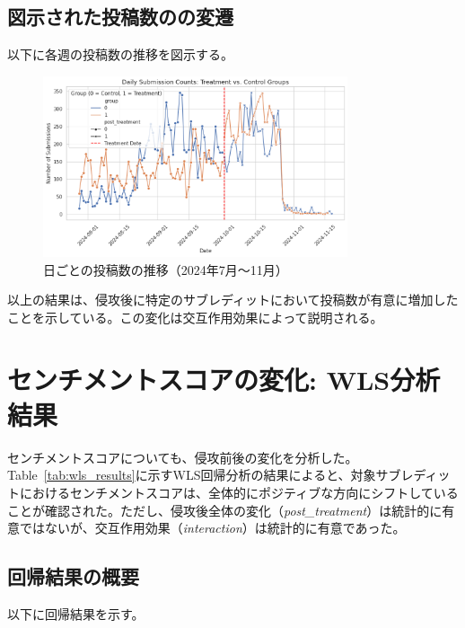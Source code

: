 \documentclass[11pt, a4j]{jreport}
\begin{document}
    \subsection*{図示された投稿数のの変遷}
    以下に各週の投稿数の推移を図示する。
    \begin{figure}[H]
        \centering
        \includegraphics[width=0.8\textwidth]{submission_count_plot.png}
        \caption{日ごとの投稿数の推移（2024年7月～11月）}
        \label{fig:submissions_comments_trends}
    \end{figure}

    以上の結果は、侵攻後に特定のサブレディットにおいて投稿数が有意に増加したことを示している。この変化は交互作用効果によって説明される。

    \section{センチメントスコアの変化: WLS分析結果}
    センチメントスコアについても、侵攻前後の変化を分析した。Table~\ref{tab:wls_results}に示すWLS回帰分析の結果によると、対象サブレディットにおけるセンチメントスコアは、全体的にポジティブな方向にシフトしていることが確認された。ただし、侵攻後全体の変化（\textit{post\_treatment}）は統計的に有意ではないが、交互作用効果（\textit{interaction}）は統計的に有意であった。

    \subsection*{回帰結果の概要}
    以下に回帰結果を示す。

    \begin{table}[H]
    \centering
    \caption{WLS Regression Results for Sentiment Score}
    \label{tab:wls_results}
    \end{table}
\end{document}
